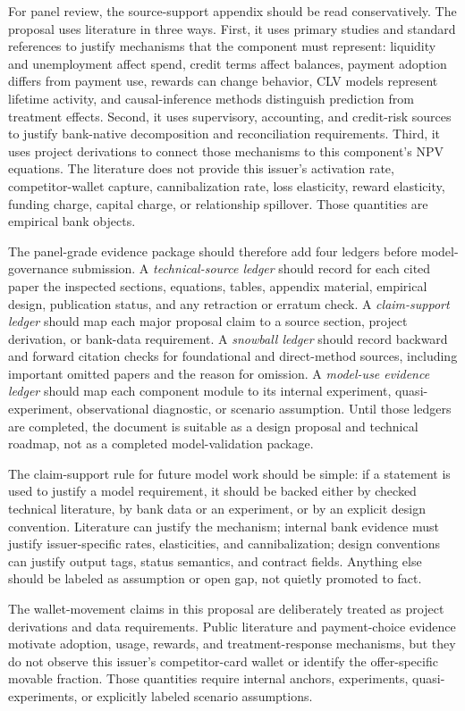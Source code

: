 \documentclass[11pt]{article}
\newcommand{\1}{\mathbf{1}}
\begin{document}
For panel review, the source-support appendix should be read conservatively.
The proposal uses literature in three ways. First, it uses primary studies and
standard references to justify mechanisms that the component must represent:
liquidity and unemployment affect spend, credit terms affect balances, payment
adoption differs from payment use, rewards can change behavior, CLV models
represent lifetime activity, and causal-inference methods distinguish
prediction from treatment effects. Second, it uses supervisory, accounting,
and credit-risk sources to justify bank-native decomposition and reconciliation
requirements. Third, it uses project derivations to connect those mechanisms
to this component's NPV equations. The literature does not provide this
issuer's activation rate, competitor-wallet capture, cannibalization rate,
loss elasticity, reward elasticity, funding charge, capital charge, or
relationship spillover. Those quantities are empirical bank objects.

The panel-grade evidence package should therefore add four ledgers before
model-governance submission. A \emph{technical-source ledger} should record
for each cited paper the inspected sections, equations, tables, appendix
material, empirical design, publication status, and any retraction or erratum
check. A \emph{claim-support ledger} should map each major proposal claim to a
source section, project derivation, or bank-data requirement. A
\emph{snowball ledger} should record backward and forward citation checks for
foundational and direct-method sources, including important omitted papers and
the reason for omission. A \emph{model-use evidence ledger} should map each
component module to its internal experiment, quasi-experiment, observational
diagnostic, or scenario assumption. Until those ledgers are completed, the
document is suitable as a design proposal and technical roadmap, not as a
completed model-validation package.

The claim-support rule for future model work should be simple: if a statement
is used to justify a model requirement, it should be backed either by checked
technical literature, by bank data or an experiment, or by an explicit design
convention. Literature can justify the mechanism; internal bank evidence must
justify issuer-specific rates, elasticities, and cannibalization; design
conventions can justify output tags, status semantics, and contract fields.
Anything else should be labeled as assumption or open gap, not quietly promoted
to fact.

The wallet-movement claims in this proposal are deliberately treated as project
derivations and data requirements. Public literature and payment-choice
evidence motivate adoption, usage, rewards, and treatment-response mechanisms,
but they do not observe this issuer's competitor-card wallet or identify the
offer-specific movable fraction. Those quantities require internal anchors,
experiments, quasi-experiments, or explicitly labeled scenario assumptions.
\end{document}
